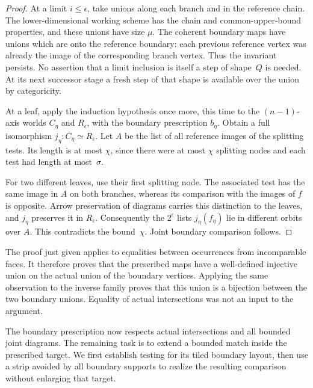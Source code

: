 \begin{proof}
At a limit $i\le\epsilon$, take unions along each branch and in
the reference chain.  The lower-dimensional working scheme has
the chain and common-upper-bound properties, and these unions have
size $\mu$.  The coherent boundary maps have unions which are
onto the reference boundary: each previous reference vertex was
already the image of the corresponding branch vertex.  Thus the
invariant persists.  No assertion that a limit inclusion is itself
a step of shape~$Q$ is needed.  At its next successor stage a fresh
step of that shape is available over the union by categoricity.

At a leaf, apply the induction hypothesis once more, this time to
the $(n-1)$-axis worlds $C_\eta$ and $R_\epsilon$, with the
boundary prescription $b_\eta$.  Obtain a full isomorphism
$j_\eta:C_\eta\simeq R_\epsilon$.  Let $A$ be the list of all
reference images of the splitting tests.  Its length is at most
$\chi$, since there were at most $\chi$ splitting nodes and each
test had length at most~$\sigma$.

For two different leaves, use their first splitting node.  The
associated test has the same image in $A$ on both branches, whereas
its comparison with the images of $f$ is opposite.  Arrow
preservation of diagrams carries this distinction to the leaves,
and $j_\eta$ preserves it in $R_\epsilon$.  Consequently the
$2^\epsilon$ lists $j_\eta(f_\eta)$ lie in different orbits over
$A$.  This contradicts the bound~$\chi$.  Joint boundary
comparison follows.
\end{proof}

\begin{remark}
The proof just given applies to equalities between occurrences from
incomparable faces.  It therefore proves that the prescribed maps
have a well-defined injective union on the actual union of the
boundary vertices.  Applying the same observation to the inverse
family proves that this union is a bijection between the two
boundary unions.  Equality of actual intersections was not an
input to the argument.
\end{remark}

The boundary prescription now respects actual intersections and all
bounded joint diagrams.  The remaining task is to extend a bounded match
inside the prescribed target.  We first establish testing for its tiled
boundary layout, then use a strip avoided by all boundary supports to
realize the resulting comparison without enlarging that target.

